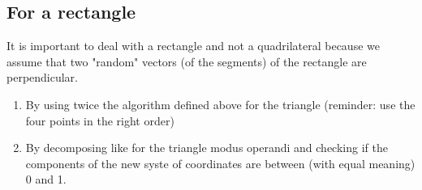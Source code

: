 \documentclass{article}
\begin{document}
    \subsection{For a rectangle}
    
    	It is important to deal with a rectangle and not a quadrilateral because we assume that two "random" vectors (of the segments) of the rectangle are perpendicular.
    
    	\begin{enumerate}
    
    	    \item By using twice the algorithm defined above for the triangle (reminder: use the four points in the right order)
    
    	    \item By decomposing like for the triangle modus operandi and checking if the components of the new syste of coordinates are between (with equal meaning) 0 and 1.
			
		\end{enumerate}
			
\end{document}
